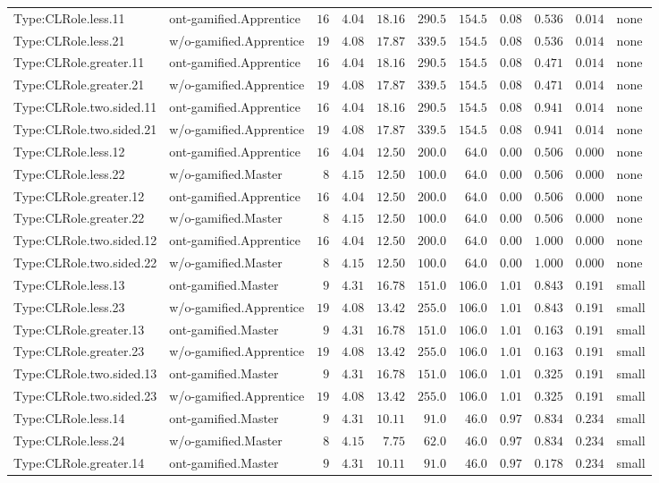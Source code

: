 \documentclass[6pt,a4paper]{article}
\begin{document}
{\begin{longtable}{llrrrrrrrrl}
Type:CLRole.less.11&ont-gamified.Apprentice&$16$&$4.04$&$18.16$&$290.5$&$154.5$&$ 0.08$&$0.536$&$0.014$&none\tabularnewline
Type:CLRole.less.21&w/o-gamified.Apprentice&$19$&$4.08$&$17.87$&$339.5$&$154.5$&$ 0.08$&$0.536$&$0.014$&none\tabularnewline
Type:CLRole.greater.11&ont-gamified.Apprentice&$16$&$4.04$&$18.16$&$290.5$&$154.5$&$ 0.08$&$0.471$&$0.014$&none\tabularnewline
Type:CLRole.greater.21&w/o-gamified.Apprentice&$19$&$4.08$&$17.87$&$339.5$&$154.5$&$ 0.08$&$0.471$&$0.014$&none\tabularnewline
Type:CLRole.two.sided.11&ont-gamified.Apprentice&$16$&$4.04$&$18.16$&$290.5$&$154.5$&$ 0.08$&$0.941$&$0.014$&none\tabularnewline
Type:CLRole.two.sided.21&w/o-gamified.Apprentice&$19$&$4.08$&$17.87$&$339.5$&$154.5$&$ 0.08$&$0.941$&$0.014$&none\tabularnewline
Type:CLRole.less.12&ont-gamified.Apprentice&$16$&$4.04$&$12.50$&$200.0$&$ 64.0$&$ 0.00$&$0.506$&$0.000$&none\tabularnewline
Type:CLRole.less.22&w/o-gamified.Master&$ 8$&$4.15$&$12.50$&$100.0$&$ 64.0$&$ 0.00$&$0.506$&$0.000$&none\tabularnewline
Type:CLRole.greater.12&ont-gamified.Apprentice&$16$&$4.04$&$12.50$&$200.0$&$ 64.0$&$ 0.00$&$0.506$&$0.000$&none\tabularnewline
Type:CLRole.greater.22&w/o-gamified.Master&$ 8$&$4.15$&$12.50$&$100.0$&$ 64.0$&$ 0.00$&$0.506$&$0.000$&none\tabularnewline
Type:CLRole.two.sided.12&ont-gamified.Apprentice&$16$&$4.04$&$12.50$&$200.0$&$ 64.0$&$ 0.00$&$1.000$&$0.000$&none\tabularnewline
Type:CLRole.two.sided.22&w/o-gamified.Master&$ 8$&$4.15$&$12.50$&$100.0$&$ 64.0$&$ 0.00$&$1.000$&$0.000$&none\tabularnewline
Type:CLRole.less.13&ont-gamified.Master&$ 9$&$4.31$&$16.78$&$151.0$&$106.0$&$ 1.01$&$0.843$&$0.191$&small\tabularnewline
Type:CLRole.less.23&w/o-gamified.Apprentice&$19$&$4.08$&$13.42$&$255.0$&$106.0$&$ 1.01$&$0.843$&$0.191$&small\tabularnewline
Type:CLRole.greater.13&ont-gamified.Master&$ 9$&$4.31$&$16.78$&$151.0$&$106.0$&$ 1.01$&$0.163$&$0.191$&small\tabularnewline
Type:CLRole.greater.23&w/o-gamified.Apprentice&$19$&$4.08$&$13.42$&$255.0$&$106.0$&$ 1.01$&$0.163$&$0.191$&small\tabularnewline
Type:CLRole.two.sided.13&ont-gamified.Master&$ 9$&$4.31$&$16.78$&$151.0$&$106.0$&$ 1.01$&$0.325$&$0.191$&small\tabularnewline
Type:CLRole.two.sided.23&w/o-gamified.Apprentice&$19$&$4.08$&$13.42$&$255.0$&$106.0$&$ 1.01$&$0.325$&$0.191$&small\tabularnewline
Type:CLRole.less.14&ont-gamified.Master&$ 9$&$4.31$&$10.11$&$ 91.0$&$ 46.0$&$ 0.97$&$0.834$&$0.234$&small\tabularnewline
Type:CLRole.less.24&w/o-gamified.Master&$ 8$&$4.15$&$ 7.75$&$ 62.0$&$ 46.0$&$ 0.97$&$0.834$&$0.234$&small\tabularnewline
Type:CLRole.greater.14&ont-gamified.Master&$ 9$&$4.31$&$10.11$&$ 91.0$&$ 46.0$&$ 0.97$&$0.178$&$0.234$&small\tabularnewline

\end{longtable}}
\end{document}
